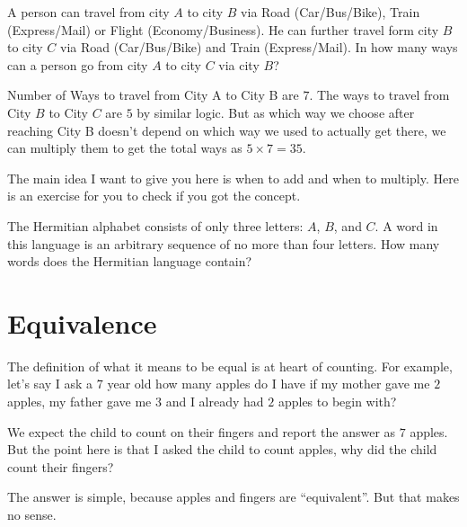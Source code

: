 \begin{example}
    A person can travel from city \(A\) to city \(B\) via Road (Car/Bus/Bike), Train (Express/Mail) or
     Flight (Economy/Business). He can further travel form city \(B\) to city \(C\) via Road (Car/Bus/Bike) 
     and Train (Express/Mail). In how many ways can a person go from city \(A\) to city 
     \(C\) via city \(B\)?
\end{example}
Number of Ways to travel from City A to City B are \(7\). The ways to travel from City \(B\) to City \(C\) 
are \(5\) by similar logic.
But as which way we choose after reaching City B doesn't depend on which way we used to actually get 
there, we can multiply them to get the total ways as \(5 \times 7 = 35\).

The main idea I want to give you here is when to add and when to multiply. Here is an exercise 
for you to check if you got the concept.

\begin{example}
    The Hermitian alphabet consists of only three letters: \(A\), \(B\), and \(C\). 
    A word in this language is an arbitrary sequence of no more than four letters. 
    How many words does the Hermitian language contain?
\end{example}

\section{Equivalence}

The definition of what it means to be equal is at heart of counting. For example, 
let's say I ask a \(7\) year old how many apples do I have if my mother gave me \(2\) apples, 
my father gave me \(3\) and I already had \(2\) apples to begin with?

We expect the child to count on their fingers and report the answer as \(7\) apples. 
But the point here is that I asked the child to count apples, why did the child count their fingers?

The answer is simple, because apples and fingers are ``equivalent''. But that makes no sense.

